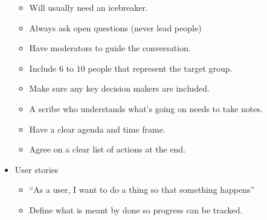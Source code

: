\begin{itemize}
          \begin{itemize}
              \item Will usually need an icebreaker.
              \item Always ask open questions (never lead people)
              \item Have moderators to guide the conversation.
              \item Include \(6\) to \(10\) people that represent the target group.
              \item Make sure any key decision makers are included.
              \item A scribe who understands what's going on needs to take notes.
              \item Have a clear agenda and time frame.
              \item Agree on a clear list of actions at the end.
          \end{itemize}

    \item User stories

          \begin{itemize}
              \item ``As a user, I want to do a thing so that something happens''
              \item Define what is meant by done so progress can be tracked.
          \end{itemize}
\end{itemize}
